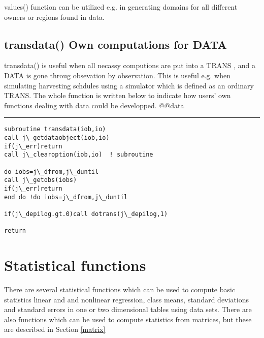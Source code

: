 \begin{note}
\textcolor{VioletRed}{values}() function can be utilized e.g. in generating domains for all different
owners or regions found in data.
\end{note}
\subsection{\textcolor{VioletRed}{transdata}() Own computations for DATA}
\label{transdata}
\textcolor{VioletRed}{transdata}() is useful when all necassy computions are put into a TRANS
, and a DATA is gone throug obsevation by observation.
This is useful e.g. when simulating harvesting schdules using a simulator which is defined
as an ordinary TRANS. The whole function is written below to indicate
how users' own functions dealing with data could be developped.
@@data
\hrule
\vspace{0.2cm}

\color{Green}
\begin{verbatim}
subroutine transdata(iob,io)
call j\_getdataobject(iob,io)
if(j\_err)return
call j\_clearoption(iob,io)  ! subroutine

do iobs=j\_dfrom,j\_duntil
call j\_getobs(iobs)
if(j\_err)return
end do !do iobs=j\_dfrom,j\_duntil

if(j\_depilog.gt.0)call dotrans(j\_depilog,1)

return
\end{verbatim}
\color{Black}
\section{Statistical functions}
\label{statistics}
There are several statistical functions which can be used to compute basic statistics
linear and and nonlinear regression, class means, standard deviations and standard errors
in one or two dimensional tables using data sets. There are also functions
which can be used to compute statistics from matrices, but these are described
in Section  \ref{matrix}
